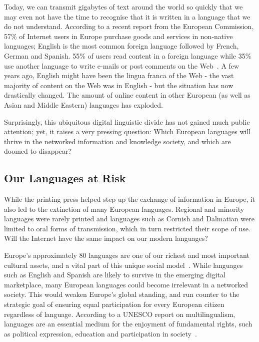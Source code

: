 \begin{multicols}{2}

Today, we can transmit gigabytes of text around the world so quickly that we may even not have the time to recognise that it is written in a language that we do not understand. According to a recent report from the European Commission, 57\% of Internet users in Europe purchase goods and services in non-native languages; English is the most common foreign language followed by French, German and Spanish. 55\% of users read content in a foreign language while 35\% use another language to write e-mails or post comments on the Web~\cite{Eurobarometer313}. A few years ago, English might have been the lingua franca of the Web - the vast majority of content on the Web was in English  - but the situation has now drastically changed. The amount of online content in other European (as well as Asian and Middle Eastern) languages has exploded.


Surprisingly, this ubiquitous digital linguistic divide has not gained much public attention; yet, it raises a very pressing question: Which European languages will thrive in the networked information and knowledge society, and which are doomed to disappear?

\subsection{Our Languages at Risk}

While the printing press helped step up the exchange of information in Europe, it also led to the extinction of many European languages. Regional and minority languages were rarely printed and languages such as Cornish and Dalmatian were limited to oral forms of transmission, which in turn restricted their scope of use. Will the Internet have the same impact on our modern languages?


Europe{\mbox '}s approximately 80 languages are one of our richest and most important cultural assets, and a vital part of this unique social model~\cite{EC2}. While languages such as English and Spanish are likely to survive in the emerging digital marketplace, many European languages could become irrelevant in a networked society. This would weaken Europe{\mbox '}s global standing, and run counter to the strategic goal of ensuring equal participation for every European citizen regardless of language. According to a UNESCO report on multilingualism, languages are an essential medium for the enjoyment of fundamental rights, such as political expression, education and participation in society~\cite{UNESCO2007}.


\end{multicols}
